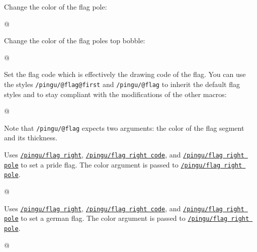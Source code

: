 \documentclass[parskip=half,english,numbers=noenddot,footnotes=nomultiple,oneside]{scrartcl}
\def\lpingu#1{\lstinline[style=lstpingu,language=pingulang]'#1'}
\newcommand*\keyref[2][/pingu/]{\hyperref[pk:#1#2]{\lpingu{#1#2}}}
\begin{document}
Change the color of the flag pole:
	\begin{tcblisting}{@}
\begin{tikzpicture}
	\pingu[flag right, flag right pole=green]
\end{tikzpicture}
\end{tcblisting}
\endsubkeyexplain

Change the color of the flag poles top bobble:
	\begin{tcblisting}{@}
\begin{tikzpicture}
	\pingu[flag right, flag right bobble=green]
\end{tikzpicture}
\end{tcblisting}
\endsubkeyexplain

Set the flag code which is effectively the drawing code of the flag.
You can use the styles \lpingu{/pingu/@flag@first} and \lpingu{/pingu/@flag} to inherit the default flag styles and to stay compliant with the modifications of the other macros:
	\begin{tcblisting}{@}
\begin{tikzpicture}
	\pingu[flag right, flag right code={
	  \node[/pingu/@flag@first,
	  	/pingu/@flag={blue}{5mm}]
	  		(upper) at (0,0) {};
	  \node[below,/pingu/@flag={black}{4mm}]
	  	(lower) at (upper.south) {};
	}]
\end{tikzpicture}
\end{tcblisting}
Note that \lpingu{/pingu/@flag} expects two arguments: the color of the flag segment and its thickness.
\endsubkeyexplain

	Uses \keyref{flag right}, \keyref{flag right code}, and \keyref{flag right pole} to set a pride flag. The color argument is passed to \keyref{flag right pole}.
\begin{tcblisting}{@}
\begin{tikzpicture}
	\pingu[pride flag right=green]
\end{tikzpicture}
\end{tcblisting}
\endshowkeyexplain


	Uses \keyref{flag right}, \keyref{flag right code}, and \keyref{flag right pole} to set a german flag. The color argument is passed to \keyref{flag right pole}.
\begin{tcblisting}{@}
\begin{tikzpicture}
	\pingu[german flag right=green]
\end{tikzpicture}
\end{tcblisting}
\endshowkeyexplain
\end{document}
